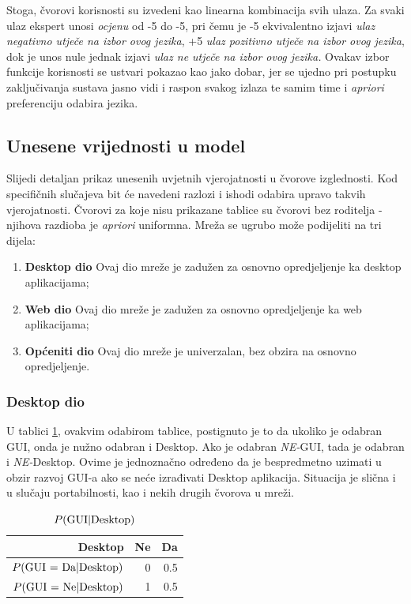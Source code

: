 \documentclass{article}
\begin{document}
	Stoga, čvorovi korisnosti su izvedeni kao linearna kombinacija svih ulaza. Za svaki ulaz ekspert unosi \textit{ocjenu} od -5 do -5, pri čemu je -5 ekvivalentno izjavi \textit{ ulaz negativno utječe na izbor ovog jezika}, +5 \textit{ulaz pozitivno utječe na izbor ovog jezika}, dok je unos nule jednak izjavi \textit{ulaz ne utječe na izbor ovog jezika.} Ovakav izbor funkcije korisnosti se ustvari pokazao kao jako dobar, jer se ujedno pri postupku zaključivanja sustava jasno vidi i raspon svakog izlaza te samim time i \textit{apriori} preferenciju odabira jezika.
	
	\subsection{Unesene vrijednosti u model}
	Slijedi detaljan prikaz unesenih uvjetnih vjerojatnosti u čvorove izglednosti. Kod specifičnih slučajeva bit će navedeni razlozi i ishodi odabira upravo takvih vjerojatnosti. Čvorovi za koje nisu prikazane tablice su čvorovi bez roditelja - njihova razdioba je \textit{apriori} uniformna. Mreža se ugrubo može podijeliti na tri dijela:
	\begin{enumerate}
		\item \textbf{Desktop dio} Ovaj dio mreže je zadužen za osnovno opredjeljenje ka desktop aplikacijama;
		\item \textbf{Web dio} Ovaj dio mreže je zadužen za osnovno opredjeljenje ka web aplikacijama;
		\item \textbf{Općeniti dio} Ovaj dio mreže je univerzalan, bez obzira na osnovno opredjeljenje.
		
	\end{enumerate}
	
	\subsubsection{Desktop dio}
	
	U tablici \ref{fig:gui_p}, ovakvim odabirom tablice, postignuto je to da ukoliko je odabran GUI, onda je nužno odabran i Desktop. Ako je odabran \textit{NE-}GUI, tada je odabran i \textit{NE-}Desktop. Ovime je jednoznačno određeno da je bespredmetno uzimati u obzir razvoj GUI-a ako se neće izrađivati Desktop aplikacija. Situacija je slična i u slučaju portabilnosti, kao i nekih drugih čvorova u mreži.
	
	\begin{table}[h]
		\centering
		\begin{tabular}{ r || r | r }
			Desktop	& Ne & Da \\ \hline
			$ P(\textnormal{GUI = Da} | \textnormal{Desktop}) $ & 0 & 0.5 \\
			$ P(\textnormal{GUI = Ne} | \textnormal{Desktop}) $ & 1 & 0.5 \\
			
		\end{tabular}
		\caption{$ P(\textnormal{GUI} | \textnormal{Desktop}) $}
		\label{fig:gui_p}
	\end{table}
	
\end{document}

